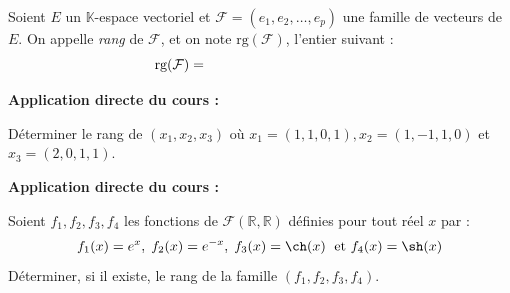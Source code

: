 \documentclass[french,11pt,twoside]{VcCours}
\newenvironment{ApplicationDirecte}{\textbf{Application directe du cours :}

}{}
\begin{document}
\begin{Definition}{} Soient $E$ un $\mathbb{K}$-espace vectoriel et $\mathcal{F} = (e_1, e_2, \ldots, e_p)$ une famille de vecteurs de $E$. On appelle \emph{rang} de $\mathcal{F}$, et on note $\textrm{rg}(\mathcal{F})$, l'entier suivant :
$$ \textrm{rg}(\mathcal{F}) = \phantom{\textrm{dim}(\Vect(e_1, e_2, \ldots, e_p))}$$
\end{Definition}

\begin{ApplicationDirecte} Déterminer le rang de $(x_{1} ,x_{2} ,x_{3})$ où $x_{1} = (1,1,0,1),x_{2} = (1, - 1,1,0)$ et $x_{3} = (2,0,1,1)$. \end{ApplicationDirecte}

\begin{ApplicationDirecte} Soient $f_1,f_2,f_3,f_4$ les fonctions de $\mathcal{F}(\mathbb{R}, \mathbb{R})$ définies pour tout réel $x$ par :
$$  f_1(x)=e^x, \; f_2(x)=e^{-x}, \; f_3(x) = \ch(x) \; \hbox{ et } f_4(x)=\sh(x)$$
Déterminer, si il existe, le rang de la famille $(f_1,f_2,f_3,f_4)$.
\end{ApplicationDirecte}


%
%
%
%
%
%
%
%
%
%
%


 
 
 
 
 
 
\end{document}
